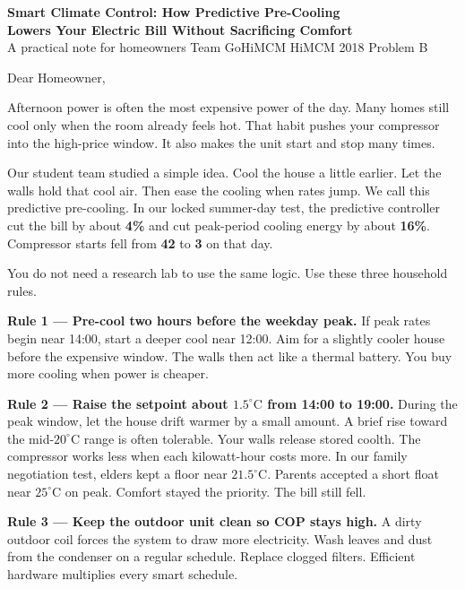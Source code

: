 \documentclass[11pt]{article}
\begin{document}
\begin{center}
{\Large\bfseries Smart Climate Control: How Predictive Pre-Cooling\\
Lowers Your Electric Bill Without Sacrificing Comfort}\\[0.6em]
{\small A practical note for homeowners \quad Team GoHiMCM \quad HiMCM 2018 Problem B}
\end{center}

\vspace{0.8em}
\noindent
Dear Homeowner,

\medskip
\noindent
Afternoon power is often the most expensive power of the day.
Many homes still cool only when the room already feels hot.
That habit pushes your compressor into the high-price window.
It also makes the unit start and stop many times.

\medskip
\noindent
Our student team studied a simple idea.
Cool the house a little earlier.
Let the walls hold that cool air.
Then ease the cooling when rates jump.
We call this predictive pre-cooling.
In our locked summer-day test, the predictive controller cut the bill by about
\textbf{4\%} and cut peak-period cooling energy by about \textbf{16\%}.
Compressor starts fell from \textbf{42} to \textbf{3} on that day.

\medskip
\noindent
You do not need a research lab to use the same logic.
Use these three household rules.

\medskip
\noindent\textbf{Rule 1 --- Pre-cool two hours before the weekday peak.}
If peak rates begin near 14:00, start a deeper cool near 12:00.
Aim for a slightly cooler house before the expensive window.
The walls then act like a thermal battery.
You buy more cooling when power is cheaper.

\medskip
\noindent\textbf{Rule 2 --- Raise the setpoint about $1.5^\circ\mathrm{C}$ from 14:00 to 19:00.}
During the peak window, let the house drift warmer by a small amount.
A brief rise toward the mid-$20^\circ\mathrm{C}$ range is often tolerable.
Your walls release stored coolth.
The compressor works less when each kilowatt-hour costs more.
In our family negotiation test, elders kept a floor near $21.5^\circ\mathrm{C}$.
Parents accepted a short float near $25^\circ\mathrm{C}$ on peak.
Comfort stayed the priority.
The bill still fell.

\medskip
\noindent\textbf{Rule 3 --- Keep the outdoor unit clean so COP stays high.}
A dirty outdoor coil forces the system to draw more electricity.
Wash leaves and dust from the condenser on a regular schedule.
Replace clogged filters.
Efficient hardware multiplies every smart schedule.
\end{document}
